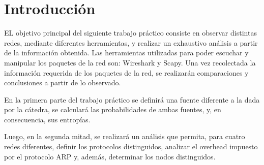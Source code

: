 \section{Introducción}
EL objetivo principal del siguiente trabajo práctico consiste en observar distintas redes, mediante diferentes herramientas, y realizar un exhaustivo análisis a partir de la información obtenida. Las herramientas utilizadas para poder escuchar y manipular los paquetes de la red son: Wireshark y Scapy. Una vez recolectada la información requerida de los paquetes de la red, se realizarán comparaciones y conclusiones a partir de lo observado. 

En la primera parte del trabajo práctico se definirá una fuente diferente a la dada por la cátedra, se calculará las probabilidades de ambas fuentes, y, en consecuencia, sus entropías. 

Luego, en la segunda mitad, se realizará un análisis que permita, para cuatro redes diferentes, definir los protocolos distinguidos, analizar el overhead impuesto por el protocolo ARP y, además, determinar los nodos distinguidos. 